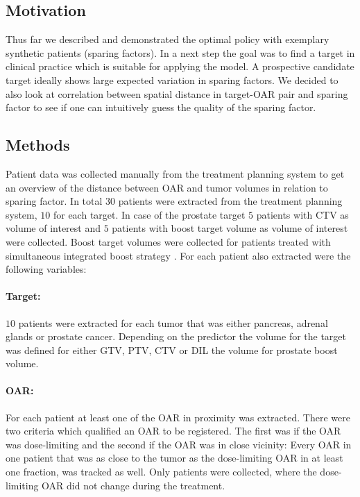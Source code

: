 \documentclass[\relativeRoot/ada.tex]{subfiles}
\begin{document}
\subsection{Motivation}
Thus far we described and demonstrated the optimal policy with exemplary synthetic patients (sparing factors). In a next step the goal was to find a target in clinical practice which is suitable for applying the model. A prospective candidate target ideally shows large expected variation in sparing factors. We decided to also look at correlation between spatial distance in target-OAR pair and sparing factor to see if one can intuitively guess the quality of the sparing factor.


\subsection{Methods}
Patient data was collected manually from the treatment planning system to get an overview of the distance between OAR and tumor volumes in relation to sparing factor. In total $30$ patients were extracted from the treatment planning system, $10$ for each target. In case of the prostate target $5$ patients with CTV as volume of interest and $5$ patients with boost target volume as volume of interest were collected. Boost target volumes were collected for patients treated with simultaneous integrated boost strategy \cite{orlandi_sib_clinical} \cite{mohan_sib}. For each patient also extracted were the following variables:

\paragraph{Target:} $10$ patients were extracted for each tumor that was either pancreas, adrenal glands or prostate cancer. Depending on the predictor the volume for the target was defined for either GTV, PTV, CTV or DIL the volume for prostate boost volume.

\paragraph{OAR:} For each patient at least one of the OAR in proximity was extracted. There were two criteria which qualified an OAR to be registered. The first was if the OAR was dose-limiting and the second if the OAR was in close vicinity: Every OAR in one patient that was as close to the tumor as the dose-limiting OAR in at least one fraction, was tracked as well. Only patients were collected, where the dose-limiting OAR did not change during the treatment.
\end{document}
